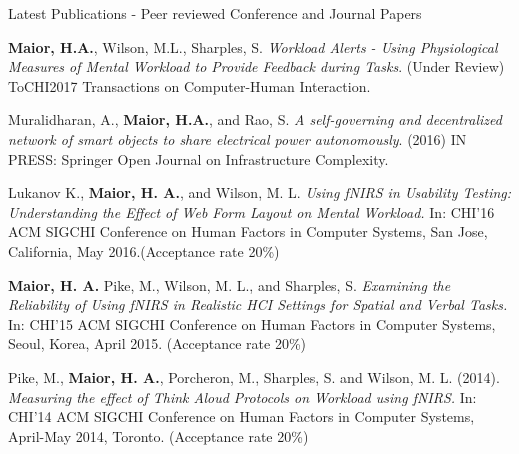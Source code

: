 \documentclass{resume} %
\begin{document}
\begin{rSection}{Latest Publications - Peer reviewed Conference and Journal Papers}

\item \textbf{Maior, H.A.}, Wilson, M.L., Sharples, S. \emph{Workload Alerts - Using Physiological Measures of Mental Workload to Provide Feedback during Tasks}. (Under Review) ToCHI2017 Transactions on Computer-Human Interaction.

\item Muralidharan, A., \textbf{Maior, H.A.}, and Rao, S. \emph{A self-governing and decentralized network of smart objects to share electrical power autonomously}. (2016) IN PRESS: Springer Open Journal on Infrastructure Complexity.
 	
\item Lukanov K., \textbf{Maior, H. A.}, and Wilson, M. L. \emph{Using fNIRS in Usability Testing: Understanding the Effect of Web Form Layout on Mental Workload.} In: CHI'16 ACM SIGCHI Conference on Human Factors in Computer Systems, San Jose, California, May 2016.(Acceptance rate 20\%)

\item \textbf{Maior, H. A.} Pike, M., Wilson, M. L., and Sharples, S. \emph{Examining the Reliability of Using fNIRS in Realistic HCI Settings for Spatial and Verbal Tasks.} In: CHI'15 ACM SIGCHI Conference on Human Factors in Computer Systems, Seoul, Korea, April 2015. (Acceptance rate 20\%)


\item Pike, M., \textbf{Maior, H. A.}, Porcheron, M., Sharples, S. and Wilson, M. L. (2014). \emph{Measuring the effect of Think Aloud Protocols on Workload using fNIRS.} In: CHI'14 ACM SIGCHI Conference on Human Factors in Computer Systems, April-May 2014, Toronto. (Acceptance rate 20\%)



\end{rSection}
\end{document}
